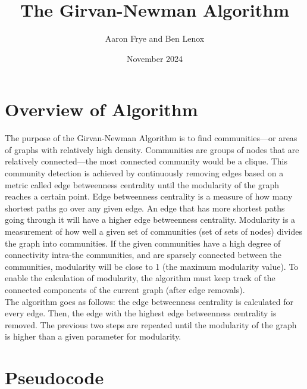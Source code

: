 \documentclass{article}
\title{The Girvan-Newman Algorithm}
\author{Aaron Frye and Ben Lenox}
\date{November 2024}
\begin{document}

\maketitle

\section{Overview of Algorithm}

The purpose of the Girvan-Newman Algorithm is to find communities---or areas of graphs with relatively high density.  Communities are groups of nodes that are relatively connected---the most connected community would be a clique.  This community detection is achieved by continuously removing edges based on a metric called edge betweenness centrality until the modularity of the graph reaches a certain point.  Edge betweenness centrality is a measure of how many shortest paths go over any given edge.  An edge that has more shortest paths going through it will have a higher edge betweenness centrality.  Modularity is a measurement of how well a given set of communities (set of sets of nodes) divides the graph into communities.  If the given communities have a high degree of connectivity intra-the communities, and are sparsely connected between the communities, modularity will be close to 1 (the maximum modularity value).  To enable the calculation of modularity, the algorithm must keep track of the connected components of the current graph (after edge removals). \\

The algorithm goes as follows: the edge betweenness centrality is calculated for every edge.  Then, the edge with the highest edge betweenness centrality is removed. The previous two steps are repeated until the modularity of the graph is higher than a given parameter for modularity.

\section{Pseudocode}
\end{document}
